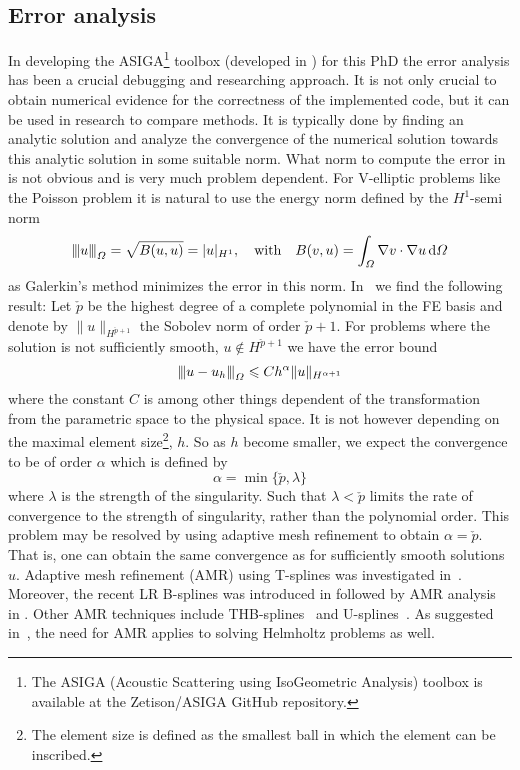 \subsection{Error analysis}
In developing the ASIGA\footnote{The ASIGA (Acoustic Scattering using IsoGeometric Analysis) toolbox is available at the Zetison/ASIGA GitHub repository.} toolbox (developed in \MATLAB) for this PhD the error analysis has been a crucial debugging and researching approach. It is not only crucial to obtain numerical evidence for the correctness of the implemented code, but it can be used in research to compare methods. It is typically done by finding an analytic solution and analyze the convergence of the numerical solution towards this analytic solution in some suitable norm. What norm to compute the error in is not obvious and is very much problem dependent. For V-elliptic problems like the Poisson problem it is natural to use the energy norm defined by the $H^1$-semi norm
\begin{equation*}
	\energyNorm{u}{\Omega} = \sqrt{B(u, u)} = |u|_{H^1}, \quad\text{with}\quad B(v,u) = \int_\Omega \nabla v\cdot\nabla u\idiff \Omega
\end{equation*}
as Galerkin's method minimizes the error in this norm. In~\cite{Johannessen2014iau} we find the following result: Let $\check{p}$ be the highest degree of a complete polynomial in the FE basis and denote by $\|u\|_{H^{\check{p}+1}}$ the Sobolev norm of order $\check{p}+1$. For problems where the solution is not sufficiently smooth, $u\not\in H^{\check{p}+1}$ we have the error bound
\begin{equation*}
	\energyNorm{u - u_h}{\Omega}\leq C h^\alpha\| u\|_{H^{\alpha+1}}
\end{equation*}
where the constant $C$ is among other things dependent of the transformation from the parametric space to the physical space. It is not however depending on the maximal element size\footnote{The element size is defined as the smallest ball in which the element can be inscribed.}, $h$. So as $h$ become smaller, we expect the convergence to be of order $\alpha$ which is defined by
\begin{equation*}
	\alpha = \min\{\check{p},\lambda\}
\end{equation*}
where $\lambda$ is the strength of the singularity. Such that $\lambda<\check{p}$ limits the rate of convergence to the strength of singularity, rather than the polynomial order. This problem may be resolved by using adaptive mesh refinement to obtain $\alpha=\check{p}$. That is, one can obtain the same convergence as for sufficiently smooth solutions $u$. Adaptive mesh refinement (AMR) using T-splines was investigated in~\cite{Bazilevs2010iau,Scott2012lro}. Moreover, the recent LR B-splines was introduced in \cite{dokken2013pso} followed by AMR analysis in \cite{Johannessen2015dcd,Johannessen2015ots,Kumar2015sap,Kumar2017spr}. Other AMR techniques include THB-splines~\cite{Giannelli2012tst,Wei2015thc} and U-splines~\cite{Sangalli2016uss}. As suggested in~\cite{Gerdes1996so3}, the need for AMR applies to solving Helmholtz problems as well. 

